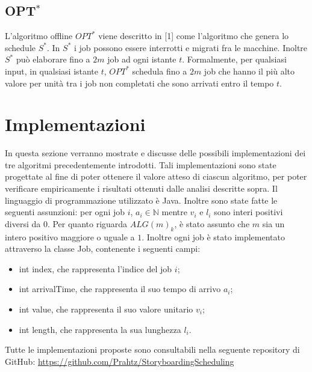 \documentclass[twoside,openany,titlepage,fleqn,
	headinclude,12pt,a4paper,BCOR5mm,footinclude]{scrbook}
\newcommand*{\N}{\mathbb{N}}
\begin{document}
\section{OPT$^{*}$} 
L'algoritmo offline $OPT^{*}$ viene descritto in [1] come l'algoritmo che genera lo schedule $S^{*}$. In $S^{*}$ i job possono essere interrotti e migrati fra le macchine. Inoltre $S^{*}$ può elaborare fino a $2m$ job ad ogni istante $t$. Formalmente, per qualsiasi input, in qualsiasi istante $t$, $OPT^{*}$ schedula fino a $2m$ job che hanno il più alto valore per unità tra i job non completati che sono arrivati entro il tempo $t$.
\chapter{Implementazioni}
In questa sezione verranno mostrate e discusse delle possibili implementazioni  dei tre algoritmi precedentemente introdotti. Tali implementazioni sono state progettate al fine di poter ottenere il valore atteso di ciascun algoritmo, per poter verificare empiricamente i risultati ottenuti dalle analisi descritte sopra. Il linguaggio di programmazione utilizzato è Java. Inoltre sono state fatte le seguenti assunzioni: per ogni job $i$, $a_{i} \in \N$ mentre $v_{i}$ e $l_{i}$ sono interi positivi diversi da $0$. Per quanto riguarda $ALG(m)_{k}$, è stato assunto che $m$ sia un intero positivo maggiore o uguale a $1$. Inoltre ogni job è stato implementato attraverso la classe Job, contenente i seguenti campi:
\begin{itemize}
\item{int index, che rappresenta l’indice del job $i$;}
\item{int arrivalTime, che rappresenta il suo tempo di arrivo $a_{i}$;}
\item{int value, che rappresenta il suo valore unitario $v_{i}$;}
\item{int length, che rappresenta la sua lunghezza $l_{i}$.}
\end{itemize}
Tutte le implementazioni proposte sono consultabili nella seguente repository di GitHub: \url{https://github.com/Prahtz/StoryboardingScheduling}
\end{document}
